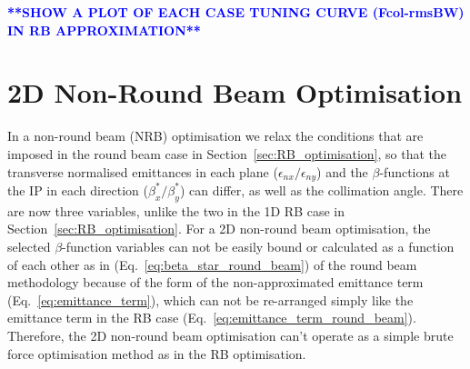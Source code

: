 \documentclass[../main.tex]{subfiles}
\begin{document}
\textcolor{blue}{\textbf{**SHOW A PLOT OF EACH CASE TUNING CURVE (Fcol-rmsBW) IN RB APPROXIMATION**}}

\section{2D Non-Round Beam Optimisation}
\label{sec:NRB_optimisation}

In a non-round beam (NRB) optimisation we relax the conditions that are imposed in the round beam case in Section~\ref{sec:RB_optimisation}, so that the transverse normalised emittances in each plane ($\epsilon_{nx}/\epsilon_{ny}$) and the $\beta$-functions at the IP in each direction ($\beta_{x}^{*}/\beta_{y}^{*}$) can differ, as well as the collimation angle. There are now three variables, unlike the two in the 1D RB case in Section~\ref{sec:RB_optimisation}. For a 2D non-round beam optimisation, the selected $\beta$-function variables can not be easily bound or calculated as a function of each other as in (Eq.~\ref{eq:beta_star_round_beam}) of the round beam methodology because of the form of the non-approximated emittance term (Eq.~\ref{eq:emittance_term}), which can not be re-arranged simply like the emittance term in the RB case (Eq.~\ref{eq:emittance_term_round_beam}). Therefore, the 2D non-round beam optimisation can't operate as a simple brute force optimisation method as in the RB optimisation.
\end{document}
